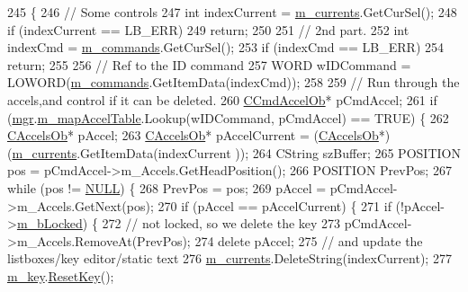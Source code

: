 \begin{DoxyCode}
245 \{
246   \textcolor{comment}{// Some controls}
247   \textcolor{keywordtype}{int} indexCurrent = \mbox{\hyperlink{class_accel_editor_a31909da8a929ef7b5e22ffbf64f1c68c}{m\_currents}}.GetCurSel();
248   \textcolor{keywordflow}{if} (indexCurrent == LB\_ERR)
249     \textcolor{keywordflow}{return};
250   
251   \textcolor{comment}{// 2nd part.}
252   \textcolor{keywordtype}{int} indexCmd = \mbox{\hyperlink{class_accel_editor_aba4ea3d3eced08de9fe39e307b5f40fc}{m\_commands}}.GetCurSel();
253   \textcolor{keywordflow}{if} (indexCmd == LB\_ERR)
254     \textcolor{keywordflow}{return};
255 
256   \textcolor{comment}{// Ref to the ID command}
257   WORD wIDCommand = LOWORD(\mbox{\hyperlink{class_accel_editor_aba4ea3d3eced08de9fe39e307b5f40fc}{m\_commands}}.GetItemData(indexCmd));
258 
259   \textcolor{comment}{// Run through the accels,and control if it can be deleted.}
260   \mbox{\hyperlink{class_c_cmd_accel_ob}{CCmdAccelOb}}* pCmdAccel;
261   \textcolor{keywordflow}{if} (\mbox{\hyperlink{class_accel_editor_acb731e2193cb5022a95e83122651f96d}{mgr}}.\mbox{\hyperlink{class_c_accelerator_manager_a16b8d3e9328bc0eeeb048630deff2768}{m\_mapAccelTable}}.Lookup(wIDCommand, pCmdAccel) == TRUE) \{
262     \mbox{\hyperlink{class_c_accels_ob}{CAccelsOb}}* pAccel;
263     \mbox{\hyperlink{class_c_accels_ob}{CAccelsOb}}* pAccelCurrent = (\mbox{\hyperlink{class_c_accels_ob}{CAccelsOb}}*)(\mbox{\hyperlink{class_accel_editor_a31909da8a929ef7b5e22ffbf64f1c68c}{m\_currents}}.GetItemData(indexCurrent
      ));
264     CString szBuffer;
265     POSITION pos = pCmdAccel->m\_Accels.GetHeadPosition();
266     POSITION PrevPos;
267     \textcolor{keywordflow}{while} (pos != \mbox{\hyperlink{getopt1_8c_a070d2ce7b6bb7e5c05602aa8c308d0c4}{NULL}}) \{
268       PrevPos = pos;
269       pAccel = pCmdAccel->m\_Accels.GetNext(pos);
270       \textcolor{keywordflow}{if} (pAccel == pAccelCurrent) \{
271         \textcolor{keywordflow}{if} (!pAccel->\mbox{\hyperlink{class_c_accels_ob_ad8300bd20bd429ad61f89700e388dd9a}{m\_bLocked}}) \{
272           \textcolor{comment}{// not locked, so we delete the key}
273           pCmdAccel->m\_Accels.RemoveAt(PrevPos);
274           \textcolor{keyword}{delete} pAccel;
275           \textcolor{comment}{// and update the listboxes/key editor/static text}
276           \mbox{\hyperlink{class_accel_editor_a31909da8a929ef7b5e22ffbf64f1c68c}{m\_currents}}.DeleteString(indexCurrent);
277           \mbox{\hyperlink{class_accel_editor_af0875f914fdddf5233a951cabd499a4d}{m\_key}}.\mbox{\hyperlink{class_c_keyboard_edit_ad0185cc0cad77250cc32ef1d9ffb8593}{ResetKey}}();

\end{DoxyCode}
